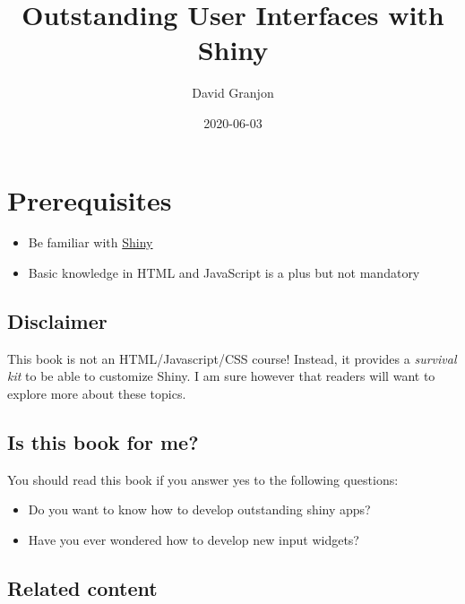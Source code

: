 \documentclass[
]{book}
\title{Outstanding User Interfaces with Shiny}
\author{David Granjon}
\date{2020-06-03}
\providecommand{\tightlist}{%
  \setlength{\itemsep}{0pt}\setlength{\parskip}{0pt}}
\begin{document}
\maketitle

{
\setcounter{tocdepth}{1}
\tableofcontents
}
\hypertarget{prerequisites}{%
\chapter*{Prerequisites}\label{prerequisites}}

\begin{itemize}
\tightlist
\item
  Be familiar with \href{https://mastering-shiny.org}{Shiny}
\item
  Basic knowledge in HTML and JavaScript is a plus but not mandatory
\end{itemize}

\hypertarget{disclaimer}{%
\section*{Disclaimer}\label{disclaimer}}

This book is not an HTML/Javascript/CSS course! Instead, it provides a \emph{survival kit} to be able to customize Shiny. I am sure however that readers will want to explore more about these topics.

\hypertarget{is-this-book-for-me}{%
\section*{Is this book for me?}\label{is-this-book-for-me}}

You should read this book if you answer yes to the following questions:

\begin{itemize}
\tightlist
\item
  Do you want to know how to develop outstanding shiny apps?
\item
  Have you ever wondered how to develop new input widgets?
\end{itemize}

\hypertarget{related-content}{%
\section*{Related content}\label{related-content}}
\end{document}
